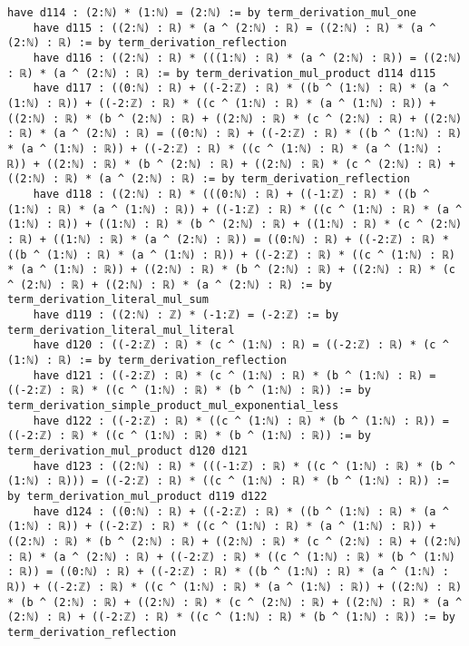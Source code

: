 \documentclass{article}
\begin{document}
\begin{tcolorbox}[colback=white!10, width=\linewidth]
\begin{lstlisting}[language=Lean4]
    have d114 : (2:ℕ) * (1:ℕ) = (2:ℕ) := by term_derivation_mul_one
    have d115 : ((2:ℕ) : ℝ) * (a ^ (2:ℕ) : ℝ) = ((2:ℕ) : ℝ) * (a ^ (2:ℕ) : ℝ) := by term_derivation_reflection
    have d116 : ((2:ℕ) : ℝ) * (((1:ℕ) : ℝ) * (a ^ (2:ℕ) : ℝ)) = ((2:ℕ) : ℝ) * (a ^ (2:ℕ) : ℝ) := by term_derivation_mul_product d114 d115
    have d117 : ((0:ℕ) : ℝ) + ((-2:ℤ) : ℝ) * ((b ^ (1:ℕ) : ℝ) * (a ^ (1:ℕ) : ℝ)) + ((-2:ℤ) : ℝ) * ((c ^ (1:ℕ) : ℝ) * (a ^ (1:ℕ) : ℝ)) + ((2:ℕ) : ℝ) * (b ^ (2:ℕ) : ℝ) + ((2:ℕ) : ℝ) * (c ^ (2:ℕ) : ℝ) + ((2:ℕ) : ℝ) * (a ^ (2:ℕ) : ℝ) = ((0:ℕ) : ℝ) + ((-2:ℤ) : ℝ) * ((b ^ (1:ℕ) : ℝ) * (a ^ (1:ℕ) : ℝ)) + ((-2:ℤ) : ℝ) * ((c ^ (1:ℕ) : ℝ) * (a ^ (1:ℕ) : ℝ)) + ((2:ℕ) : ℝ) * (b ^ (2:ℕ) : ℝ) + ((2:ℕ) : ℝ) * (c ^ (2:ℕ) : ℝ) + ((2:ℕ) : ℝ) * (a ^ (2:ℕ) : ℝ) := by term_derivation_reflection
    have d118 : ((2:ℕ) : ℝ) * (((0:ℕ) : ℝ) + ((-1:ℤ) : ℝ) * ((b ^ (1:ℕ) : ℝ) * (a ^ (1:ℕ) : ℝ)) + ((-1:ℤ) : ℝ) * ((c ^ (1:ℕ) : ℝ) * (a ^ (1:ℕ) : ℝ)) + ((1:ℕ) : ℝ) * (b ^ (2:ℕ) : ℝ) + ((1:ℕ) : ℝ) * (c ^ (2:ℕ) : ℝ) + ((1:ℕ) : ℝ) * (a ^ (2:ℕ) : ℝ)) = ((0:ℕ) : ℝ) + ((-2:ℤ) : ℝ) * ((b ^ (1:ℕ) : ℝ) * (a ^ (1:ℕ) : ℝ)) + ((-2:ℤ) : ℝ) * ((c ^ (1:ℕ) : ℝ) * (a ^ (1:ℕ) : ℝ)) + ((2:ℕ) : ℝ) * (b ^ (2:ℕ) : ℝ) + ((2:ℕ) : ℝ) * (c ^ (2:ℕ) : ℝ) + ((2:ℕ) : ℝ) * (a ^ (2:ℕ) : ℝ) := by term_derivation_literal_mul_sum
    have d119 : ((2:ℕ) : ℤ) * (-1:ℤ) = (-2:ℤ) := by term_derivation_literal_mul_literal
    have d120 : ((-2:ℤ) : ℝ) * (c ^ (1:ℕ) : ℝ) = ((-2:ℤ) : ℝ) * (c ^ (1:ℕ) : ℝ) := by term_derivation_reflection
    have d121 : ((-2:ℤ) : ℝ) * (c ^ (1:ℕ) : ℝ) * (b ^ (1:ℕ) : ℝ) = ((-2:ℤ) : ℝ) * ((c ^ (1:ℕ) : ℝ) * (b ^ (1:ℕ) : ℝ)) := by term_derivation_simple_product_mul_exponential_less
    have d122 : ((-2:ℤ) : ℝ) * ((c ^ (1:ℕ) : ℝ) * (b ^ (1:ℕ) : ℝ)) = ((-2:ℤ) : ℝ) * ((c ^ (1:ℕ) : ℝ) * (b ^ (1:ℕ) : ℝ)) := by term_derivation_mul_product d120 d121
    have d123 : ((2:ℕ) : ℝ) * (((-1:ℤ) : ℝ) * ((c ^ (1:ℕ) : ℝ) * (b ^ (1:ℕ) : ℝ))) = ((-2:ℤ) : ℝ) * ((c ^ (1:ℕ) : ℝ) * (b ^ (1:ℕ) : ℝ)) := by term_derivation_mul_product d119 d122
    have d124 : ((0:ℕ) : ℝ) + ((-2:ℤ) : ℝ) * ((b ^ (1:ℕ) : ℝ) * (a ^ (1:ℕ) : ℝ)) + ((-2:ℤ) : ℝ) * ((c ^ (1:ℕ) : ℝ) * (a ^ (1:ℕ) : ℝ)) + ((2:ℕ) : ℝ) * (b ^ (2:ℕ) : ℝ) + ((2:ℕ) : ℝ) * (c ^ (2:ℕ) : ℝ) + ((2:ℕ) : ℝ) * (a ^ (2:ℕ) : ℝ) + ((-2:ℤ) : ℝ) * ((c ^ (1:ℕ) : ℝ) * (b ^ (1:ℕ) : ℝ)) = ((0:ℕ) : ℝ) + ((-2:ℤ) : ℝ) * ((b ^ (1:ℕ) : ℝ) * (a ^ (1:ℕ) : ℝ)) + ((-2:ℤ) : ℝ) * ((c ^ (1:ℕ) : ℝ) * (a ^ (1:ℕ) : ℝ)) + ((2:ℕ) : ℝ) * (b ^ (2:ℕ) : ℝ) + ((2:ℕ) : ℝ) * (c ^ (2:ℕ) : ℝ) + ((2:ℕ) : ℝ) * (a ^ (2:ℕ) : ℝ) + ((-2:ℤ) : ℝ) * ((c ^ (1:ℕ) : ℝ) * (b ^ (1:ℕ) : ℝ)) := by term_derivation_reflection

\end{lstlisting}
\end{tcolorbox}
\end{document}
